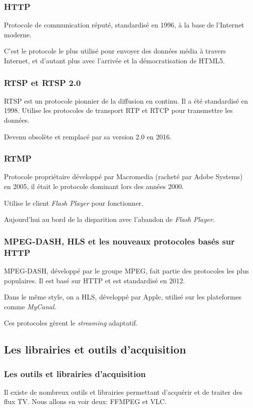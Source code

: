 \documentclass{beamer}
\begin{document}
\begin{frame}	
\frametitle{HTTP}

Protocole de communication réputé, standardisé en 1996, à la base de l'Internet moderne.

C'est le protocole le plus utilisé pour envoyer des données média à travers Internet, et d'autant plus avec l'arrivée et la démocratisation de HTML5.

\end{frame}

\begin{frame}	
\frametitle{RTSP et RTSP 2.0}

RTSP est un protocole pionnier de la diffusion en continu. Il a été standardisé en 1998.
Utilise les protocoles de transport RTP et RTCP pour transmettre les données.

Devenu obsolète et remplacé par sa version 2.0 en 2016.

\end{frame}

\begin{frame}	
\frametitle{RTMP}

Protocole propriétaire développé par Macromedia (racheté par Adobe Systems) en 2005, il était le protocole dominant lors des années 2000. 

Utilise le client \textit{Flash Player} pour fonctionner.

Aujourd'hui au bord de la disparition avec l'abandon de \textit{Flash Player}.

\end{frame}


\begin{frame}	
\frametitle{MPEG-DASH, HLS et les nouveaux protocoles basés sur HTTP}

MPEG-DASH, développé par le groupe MPEG, fait partie des protocoles les plus populaires. Il est basé sur HTTP et est standardisé en 2012. 

Dans le même style, on a HLS, développé par Apple, utilisé sur les plateformes comme \textit{MyCanal}.

Ces protocoles gèrent le \textit{streaming} adaptatif.

\end{frame}

\subsection{Les librairies et outils d'acquisition}


\begin{frame}	
\frametitle{Les outils et librairies d'acquisition}

Il existe de nombreux outils et librairies permettant d'acquérir et de traiter des flux TV. Nous allons en voir deux: FFMPEG et VLC.

\end{frame}
\end{document}
